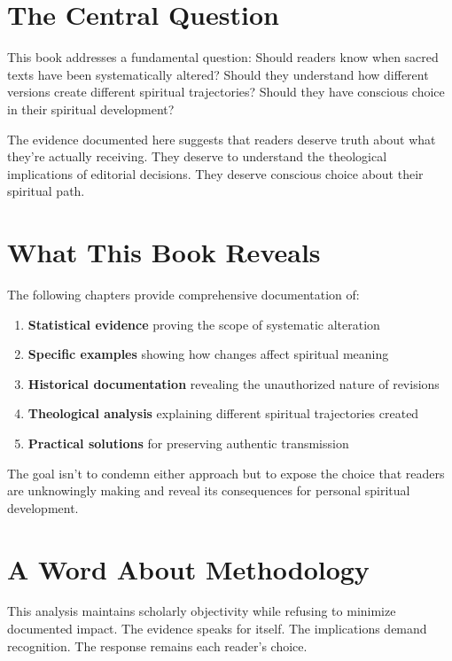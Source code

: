 \documentclass[11pt,twoside]{book}
\begin{document}
\section*{The Central Question}
\label{sec:org08c9576}

This book addresses a fundamental question: Should readers know when sacred texts have been systematically altered? Should they understand how different versions create different spiritual trajectories? Should they have conscious choice in their spiritual development?

The evidence documented here suggests that readers deserve truth about what they're actually receiving. They deserve to understand the theological implications of editorial decisions. They deserve conscious choice about their spiritual path.
\section*{What This Book Reveals}
\label{sec:org0199307}

The following chapters provide comprehensive documentation of:

\begin{enumerate}
\item \textbf{\textbf{Statistical evidence}} proving the scope of systematic alteration
\item \textbf{\textbf{Specific examples}} showing how changes affect spiritual meaning
\item \textbf{\textbf{Historical documentation}} revealing the unauthorized nature of revisions
\item \textbf{\textbf{Theological analysis}} explaining different spiritual trajectories created
\item \textbf{\textbf{Practical solutions}} for preserving authentic transmission
\end{enumerate}

The goal isn't to condemn either approach but to expose the choice that readers are unknowingly making and reveal its consequences for personal spiritual development.
\section*{A Word About Methodology}
\label{sec:org77c33cf}

This analysis maintains scholarly objectivity while refusing to minimize documented impact. The evidence speaks for itself. The implications demand recognition. The response remains each reader's choice.
\end{document}
